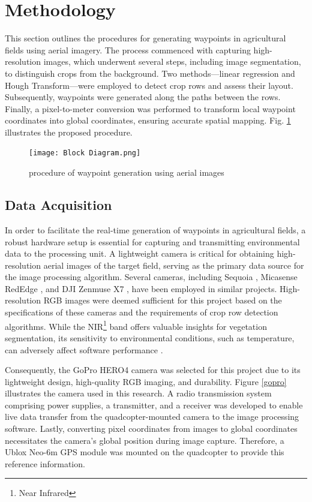 \documentclass[conference]{IEEEtran}
\begin{document}
	
	\section{Methodology}
	
	This section outlines the procedures for generating waypoints in agricultural fields using aerial imagery. The process commenced with capturing high-resolution images, which underwent several steps, including image segmentation, to distinguish crops from the background. Two methods—linear regression and Hough Transform—were employed to detect crop rows and assess their layout. Subsequently, waypoints were generated along the paths between the rows. Finally, a pixel-to-meter conversion was performed to transform local waypoint coordinates into global coordinates, ensuring accurate spatial mapping. Fig. \ref{fig_procedure} illustrates the proposed procedure.
	
	
	\begin{figure}[t]
		\texttt{[image: Block Diagram.png]}
		\caption{procedure of waypoint generation using aerial images
			\cite{b5}}
		\label{fig_procedure}
	\end{figure}
	
	\subsection{Data Acquisition}\label{Data Acquisition}
	In order to facilitate the real-time generation of waypoints in agricultural fields, a robust hardware setup is essential for capturing and transmitting environmental data to the processing unit. A lightweight camera is critical for obtaining high-resolution aerial images of the target field, serving as the primary data source for the image processing algorithm. Several cameras, including Sequoia \cite{b9,b4,b7,b6}, Micasense RedEdge \cite{b9,b14}, and DJI Zenmuse X7 \cite{b5}, have been employed in similar projects. High-resolution RGB images were deemed sufficient for this project based on the specifications of these cameras and the requirements of crop row detection algorithms. While the NIR\footnote{Near Infrared} band offers valuable insights for vegetation segmentation, its sensitivity to environmental conditions, such as temperature, can adversely affect software performance \cite{b5}. 
	
	Consequently, the GoPro HERO4 camera was selected for this project due to its lightweight design, high-quality RGB imaging, and durability. Figure \ref{gopro} illustrates the camera used in this research. A radio transmission system comprising power supplies, a transmitter, and a receiver was developed to enable live data transfer from the quadcopter-mounted camera to the image processing software. 
	Lastly, converting pixel coordinates from images to global coordinates necessitates the camera's global position during image capture. Therefore, a Ublox Neo-6m GPS module was mounted on the quadcopter to provide this reference information.
	
\end{document}
